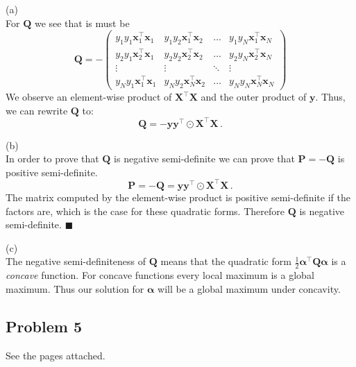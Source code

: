 \documentclass{scrartcl}
\newcommand{\qed}{\hfill $\blacksquare$}
\begin{document}
(a)\\
For $\mathbf{Q}$ we see that is must be
\begin{equation}
	\mathbf{Q} = -\begin{pmatrix}
		y_1 y_1 \mathbf{x}_1^\top \mathbf{x}_1 & y_1 y_2 \mathbf{x}_1^\top \mathbf{x}_2 & \ldots & y_1 y_N \mathbf{x}_1^\top \mathbf{x}_N\\
		y_2 y_1 \mathbf{x}_2^\top \mathbf{x}_1 & y_2 y_2 \mathbf{x}_2^\top \mathbf{x}_2 & \ldots & y_2 y_N \mathbf{x}_2^\top \mathbf{x}_N\\
		\vdots & \vdots & \ddots & \vdots\\
		y_Ny_1 \mathbf{x}_1^\top \mathbf{x}_1 & y_N y_2 \mathbf{x}_N^\top \mathbf{x}_2 & \ldots & y_N y_N \mathbf{x}_N^\top \mathbf{x}_N
	\end{pmatrix}
\end{equation}
We observe an element-wise product of $\mathbf{X^\top \mathbf{X}}$ and the outer product of $\mathbf{y}$. Thus, we can rewrite $\mathbf{Q}$ to:
\begin{equation}
	\mathbf{Q} = - \mathbf{y} \mathbf{y}^\top \odot \mathbf{X}^\top \mathbf{X} \, .
\end{equation}

(b)\\
In order to prove that $\mathbf{Q}$ is negative semi-definite we can prove that $\mathbf{P} = -\mathbf{Q}$ is positive semi-definite.
\begin{equation}
	\mathbf{P} = -\mathbf{Q} = \mathbf{y}\mathbf{y}^\top \odot \mathbf{X}^\top \mathbf{X} \, .
\end{equation}
The matrix computed by the element-wise product is positive semi-definite if the factors are, which is the case for these quadratic forms. Therefore $\mathbf{Q}$ is negative semi-definite. \qed

(c)\\
The negative semi-definiteness of $\mathbf{Q}$ means that the quadratic form $\frac{1}{2}\bm{\alpha}^\top\mathbf{Q}\bm{\alpha}$ is a \emph{concave} function. For concave functions every local maximum is a global maximum. Thus our solution for $\bm{\alpha}$ will be a global maximum under concavity.

\subsection{Problem 5}
See the pages attached.

	
\end{document}
